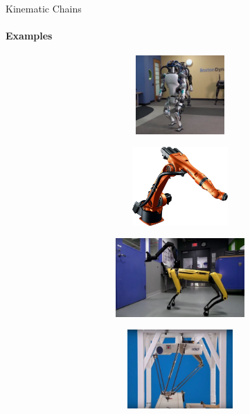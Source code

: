 \documentclass[aspectratio=169]{beamer}
\begin{document}
\begin{frame}[t]{Kinematic Chains}
    \framesubtitle{Examples}
    \vspace{-0.5cm}
        \begin{figure}[H]
            \begin{subfigure}{0.49\textwidth}
                \centering\includegraphics[height=3cm,width=1\textwidth,keepaspectratio]{kc_1.png}
                \label{fig:kc_1.png}
            \end{subfigure}
            \begin{subfigure}{0.49\textwidth}
                \centering\includegraphics[height=3cm,width=1\textwidth,keepaspectratio]{kc_2.png}
                \label{fig:kc_2.png}
            \end{subfigure}
 
            \begin{subfigure}{0.49\textwidth}
                \centering\includegraphics[height=3cm,width=1\textwidth,keepaspectratio]{kc_3.png}
                \label{fig:kc_3.png}
            \end{subfigure}
            \begin{subfigure}{0.49\textwidth}
                \centering\includegraphics[height=3cm,width=1\textwidth,keepaspectratio]{kc_4.png}
                \label{fig:kc_4.png}
            \end{subfigure}
        \end{figure}
    \end{frame}
\end{document}
